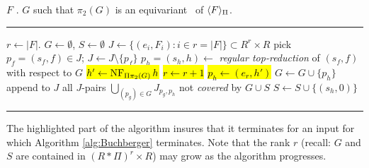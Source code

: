 \begin{algorithm}[EquivariantStrongBuchberger]
\begin{algorithmic}[1]
\REQUIRE $F$ .
\ENSURE $G$ such that $\pi_2(G)$ is an equivariant \GB\ of $\langle F \rangle_\Pi$.
\smallskip \hrule \smallskip
\STATE $r\gets |F|$.
\STATE $G\gets \emptyset$, $S\gets \emptyset$ 
\STATE $J\gets \{(e_i,F_i):i\in r=|F|\} \subset R^r\times R$ 
	\STATE pick $p_f = (s_f,f) \in J$; $J\gets J\setminus\{p_f\}$
	\STATE $p_h=(s_h,h) \gets$ {\em regular top-reduction} of $(s_f,f)$ with respect to $G$
		\STATE \hl{$h' \gets\operatorname{NF}_{\Pi\pi_2(G)} h$}
				\STATE \hl{$r\gets r+1$}
				\STATE \hl{$p_h \gets (e_r,h')$}
			\ENDIF
			\STATE $G\gets G\cup \{p_h\}$
			\STATE append to $J$ all $J$-pairs $\bigcup_{(p_g)\in G}J_{p_g,p_h}$ not {\em covered} by $G \cup S$ 
		\ENDIF
        \ELSE 
                \STATE $S\gets S\cup\{(s_h,0)\}$
	\ENDIF
\ENDWHILE
\smallskip \hrule \smallskip
\end{algorithmic}
\end{algorithm}

The highlighted part of the algorithm insures that it terminates for an input for which Algorithm \ref{alg:Buchberger} terminates.
Note that the rank $r$ (recall: $G$ and $S$ are contained in $(R*\Pi)^r\times R$) may grow as the algorithm progresses. 
